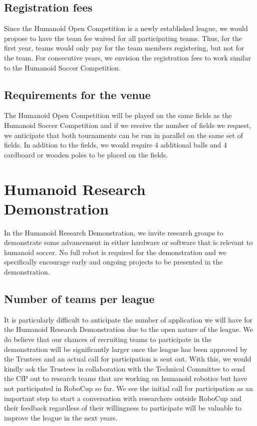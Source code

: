 \documentclass{article}
\begin{document}
\subsection{Registration fees}

Since the Humanoid Open Competition is a newly established league, we would propose to have the team fee waived for all participating teams. Thus, for the first year, teams would only pay for the team members registering, but not for the team. For consecutive years, we envision the registration fees to work similar to the Humanoid Soccer Competition.

\subsection{Requirements for the venue}
The Humanoid Open Competition will be played on the same fields as the Humanoid Soccer Competition and if we receive the number of fields we request, we anticipate that both tournaments can be run in parallel on the same set of fields. In addition to the fields, we would require 4 additional balls and 4 cardboard or wooden poles to be placed on the fields. 

\section{Humanoid Research Demonstration}
In the Humanoid Research Demonstration, we invite research groups to demonstrate some advancement in either hardware or software that is relevant to humanoid soccer. No full robot is required for the demonstration and we specifically encourage early and ongoing projects to be presented in the demonstration.

\subsection{Number of teams per league}

It is particularly difficult to anticipate the number of application we will
have for the Humanoid Research Demonstration due to the open nature of the league. We do believe that our chances of recruiting teams to participate in the demonstration will be significantly larger once the league has been approved by the Trustees and an actual call for participation is sent out. With this, we would kindly ask the Trustees in collaboration with the Technical Committee to send the CfP out to research teams that are working on humanoid robotics but have not participated in RoboCup so far. We see the initial call for participation as an important step to start a conversation with researchers outside RoboCup and their feedback regardless of their willingness to participate will be valuable to improve the league in the next years. 
\end{document}
